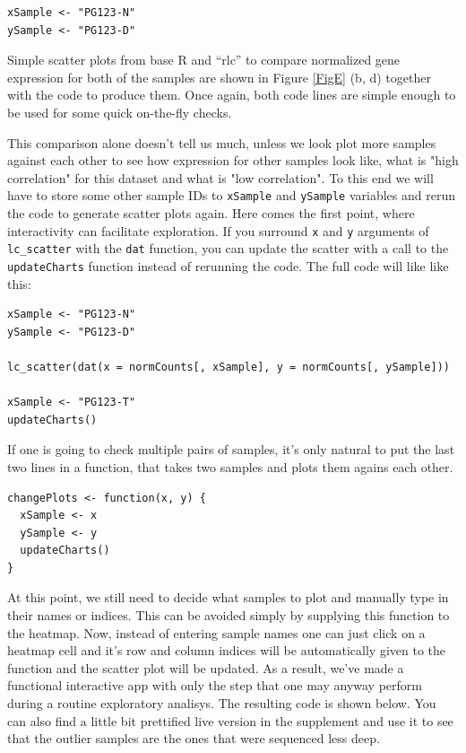 \documentclass[twocolumn,10pt]{article}
\begin{document}
\begin{verbatim}
xSample <- "PG123-N"
ySample <- "PG123-D"
\end{verbatim}

Simple scatter plots from base R and ``rlc'' to compare normalized gene expression for both of the samples are shown in Figure \ref{FigE} (b, d) together with the code to produce them. Once again, both code lines are simple enough to be used for some quick on-the-fly checks.

This comparison alone doesn't tell us much, unless we look plot more samples against each other to see how expression for other samples look like, what is "high correlation" for this dataset and what is "low correlation". To this end we will have to store some other sample IDs to \texttt{xSample} and \texttt{ySample} variables and rerun the code to generate scatter plots again. Here comes the first point, where interactivity can facilitate exploration. If you surround \texttt{x} and \texttt{y} arguments of \texttt{lc_scatter} with the \texttt{dat} function, you can update the scatter with a call to the \texttt{updateCharts} function instead of rerunning the code. The full code will like like this:

\begin{verbatim}
xSample <- "PG123-N"
ySample <- "PG123-D"

lc_scatter(dat(x = normCounts[, xSample], y = normCounts[, ySample]))

xSample <- "PG123-T"
updateCharts()
\end{verbatim}

If one is going to check multiple pairs of samples, it's only natural to put the last two lines in a function, that takes two samples and plots them agains each other.

\begin{verbatim}
changePlots <- function(x, y) {
  xSample <- x
  ySample <- y
  updateCharts()
}
\end{verbatim}

At this point, we still need to decide what samples to plot and manually type in their names or indices. This can be avoided simply by supplying this function to the heatmap. Now, instead of entering sample names one can just click on a heatmap cell and it's row and column indices will be automatically given to the function and the scatter plot will be updated. As a result, we've made a functional interactive app with only the step that one may anyway perform during a routine exploratory analisys. The resulting code is shown below. You can also find a little bit prettified live version in the supplement and use it to see that the outlier samples are the ones that were sequenced less deep.
\end{document}
